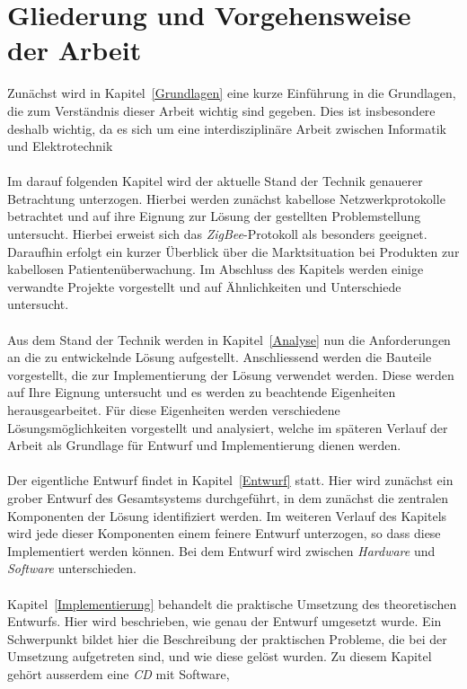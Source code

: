 \section{Gliederung und Vorgehensweise der Arbeit}
Zunächst wird in Kapitel~\ref{Grundlagen} eine kurze Einführung in die Grundlagen,
die zum Verständnis dieser Arbeit wichtig sind gegeben. Dies ist insbesondere deshalb
wichtig, da es sich um eine interdisziplinäre Arbeit zwischen Informatik und Elektrotechnik\\
\\
Im darauf folgenden Kapitel wird der aktuelle Stand der Technik genauerer Betrachtung
unterzogen. Hierbei werden zunächst kabellose Netzwerkprotokolle betrachtet und auf
ihre Eignung zur Lösung der gestellten Problemstellung untersucht. Hierbei erweist
sich das \emph{ZigBee}-Protokoll als besonders geeignet. Daraufhin erfolgt
ein kurzer Überblick über die Marktsituation bei Produkten zur kabellosen
Patientenüberwachung. Im Abschluss des Kapitels werden einige verwandte Projekte
vorgestellt und auf Ähnlichkeiten und Unterschiede untersucht.\\
\\
Aus dem Stand der Technik werden in Kapitel~\ref{Analyse} nun die Anforderungen an
die zu entwickelnde Lösung aufgestellt. Anschliessend werden die Bauteile vorgestellt,
die zur Implementierung der Lösung verwendet werden. Diese werden auf Ihre Eignung
untersucht und es werden zu beachtende Eigenheiten herausgearbeitet. Für diese
Eigenheiten werden verschiedene Lösungsmöglichkeiten vorgestellt und analysiert,
welche im späteren Verlauf der Arbeit als Grundlage für Entwurf und Implementierung
dienen werden.\\
\\
Der eigentliche Entwurf findet in Kapitel~\ref{Entwurf} statt. Hier wird zunächst
ein grober Entwurf des Gesamtsystems durchgeführt, in dem zunächst die zentralen
Komponenten der Lösung identifiziert werden. Im weiteren Verlauf des Kapitels
wird jede dieser Komponenten einem feinere Entwurf unterzogen, so dass diese
Implementiert werden können. Bei dem Entwurf wird zwischen \emph{Hardware}
und \emph{Software} unterschieden.\\
\\
Kapitel~\ref{Implementierung} behandelt die praktische Umsetzung des theoretischen Entwurfs.
Hier wird beschrieben, wie genau der Entwurf umgesetzt wurde. Ein Schwerpunkt bildet
hier die Beschreibung der praktischen Probleme, die bei der Umsetzung aufgetreten sind, 
und wie diese gelöst wurden. Zu diesem Kapitel gehört ausserdem eine \emph{CD} mit Software,
